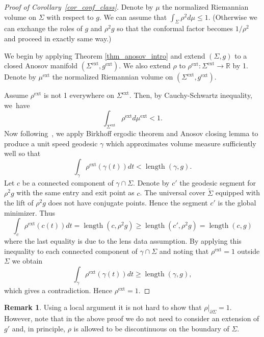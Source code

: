 \documentclass[JEP,XML,SOM,Unicode,NoFloatCountersInSection]{cedram}
\newcommand{\ext}{\mathrm{ext}}
\DeclareMathOperator{\length}{length}
\theoremstyle{definition}
\newtheorem{remark}[theorem]{Remark}
\newcommand{\field}[1]{\mathbb{#1}}
\newcommand{\R}{\field{R}}
\renewcommand{\>}{{\rangle}}
\newcommand{\<}{{\langle}}
\begin{document}
\begin{proof}[Proof of Corollary~\ref{cor_conf_class}]
Denote by $\mu$ the normalized Riemannian volume on $\Sigma$ with respect to $g$. We can assume that $\int_\Sigma\rho^2d\mu\le 1$. (Otherwise we can exchange the roles of $g$ and $\rho^2g$ so that the conformal factor becomes $1/\rho^2$ and proceed in exactly same way.)

We begin by applying Theorem \ref{thm_anosov_intro} and extend $(\Sigma, g)$ to a closed Anosov manifold $(\Sigma^{\ext}, g^{\ext})$. We also extend $\rho$ to $\rho^{\ext}\colon \Sigma^{\ext}\to\R$ by 1. Denote by $\mu^{\ext}$ the normalized Riemannian volume on $(\Sigma^{\ext}, g^{\ext})$.

Assume $\rho^{\ext}$ is not 1 everywhere on $\Sigma^{\ext}$. Then, by Cauchy-Schwartz inequality, we~have\vspace*{-3pt}
\[
\int_{\Sigma^{\ext}}\rho^{\ext}d\mu^{\ext}<1.
\]
Now following~\cite[Th.\,2]{K88}, we apply Birkhoff ergodic theorem and Anosov closing lemma to produce a unit speed geodesic $\gamma$ which approximates volume measure sufficiently well so that\vspace*{-3pt}
\[
\int_{\gamma}\rho^{\ext}(\gamma(t))dt<\length(\gamma, g).
\]
Let $c$ be a connected component of $\gamma\cap\Sigma$. Denote by $c'$ the geodesic segment for $\rho^2g$ with the same entry and exit point as $c$. The universal cover $\tilde\Sigma$ equipped with the lift of $\rho^2g$ does not have conjugate points. Hence the segment $c'$ is the global minimizer. Thus\vspace*{-3pt}
\[
\int_{c}\rho^{\ext}(c(t))dt=\length(c, \rho^2g)\ge \length(c', \rho^2g)=\length(c, g)
\]
where the last equality is due to the lens data assumption. By applying this inequality to each connected component of $\gamma\cap\Sigma$ and noting
that $\rho^{\ext}=1$ outside $\Sigma$ we obtain\vspace*{-3pt}
\[
\int_{\gamma}\rho^{\ext}(\gamma(t))dt\ge \length(\gamma, g),
\]
which gives a contradiction. Hence $\rho^{\ext}=1$.
\end{proof}

\begin{remark} Using a local argument it is not hard to show that $\rho|_{\partial\Sigma}=1$. However, note that in the above proof we do not need to consider an extension of $g'$ and, in principle, $\rho$ is allowed to be discontinuous on the boundary of $\Sigma$.
\end{remark}
\end{document}
